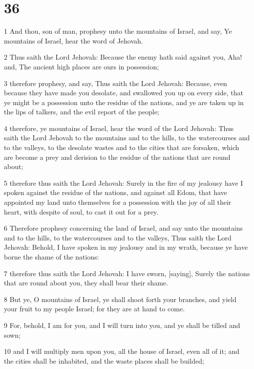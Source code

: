 \chapter{36}

\par 1 And thou, son of man, prophesy unto the mountains of Israel, and say, Ye mountains of Israel, hear the word of Jehovah.
\par 2 Thus saith the Lord Jehovah: Because the enemy hath said against you, Aha! and, The ancient high places are ours in possession;
\par 3 therefore prophesy, and say, Thus saith the Lord Jehovah: Because, even because they have made you desolate, and swallowed you up on every side, that ye might be a possession unto the residue of the nations, and ye are taken up in the lips of talkers, and the evil report of the people;
\par 4 therefore, ye mountains of Israel, hear the word of the Lord Jehovah: Thus saith the Lord Jehovah to the mountains and to the hills, to the watercourses and to the valleys, to the desolate wastes and to the cities that are forsaken, which are become a prey and derision to the residue of the nations that are round about;
\par 5 therefore thus saith the Lord Jehovah: Surely in the fire of my jealousy have I spoken against the residue of the nations, and against all Edom, that have appointed my land unto themselves for a possession with the joy of all their heart, with despite of soul, to cast it out for a prey.
\par 6 Therefore prophesy concerning the land of Israel, and say unto the mountains and to the hills, to the watercourses and to the valleys, Thus saith the Lord Jehovah: Behold, I have spoken in my jealousy and in my wrath, because ye have borne the shame of the nations:
\par 7 therefore thus saith the Lord Jehovah: I have sworn, [saying], Surely the nations that are round about you, they shall bear their shame.
\par 8 But ye, O mountains of Israel, ye shall shoot forth your branches, and yield your fruit to my people Israel; for they are at hand to come.
\par 9 For, behold, I am for you, and I will turn into you, and ye shall be tilled and sown;
\par 10 and I will multiply men upon you, all the house of Israel, even all of it; and the cities shall be inhabited, and the waste places shall be builded;
